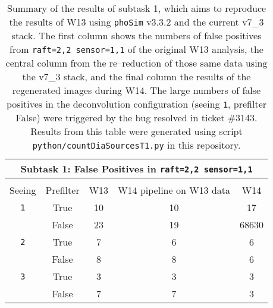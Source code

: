 \documentclass[prd, nofootinbib, floatfix, 11pt, tightenlines, times]{article}
\begin{document}

\begin{table}
\centering
\begin{tabular}{ccccc}
\hline
\multicolumn{5}{|c|}{Subtask 1: False Positives in {\tt raft=2,2 sensor=1,1}} \\ \hline \\
Seeing  & Prefilter    & W13  & W14 pipeline on W13 data   & W14   \\
\hline
{\tt 1} & True         & 10   & 10                         & 17    \\
        & False        & 23   & 19                         & 68630 \\
{\tt 2} & True         & 7    & 6                          & 6     \\
        & False        & 8    & 8                          & 6     \\
{\tt 3} & True         & 3    & 3                          & 3     \\
        & False        & 7    & 7                          & 3 
\end{tabular}
\caption[]{Summary of the results of subtask 1, which aims to
  reproduce the results of W13 using {\tt phoSim} v3.3.2 and the
  current v7\_3 stack.  The first column shows the numbers of false
  positives from {\tt raft=2,2 sensor=1,1} of the original W13
  analysis, the central column from the re--reduction of those same
  data using the v7\_3 stack, and the final column the results of the
  regenerated images during W14.  The large numbers of false positives
  in the deconvolution configuration (seeing {\tt 1}, prefilter False)
  were triggered by the bug resolved in ticket \#3143.  Results from
  this table were generated using script {\tt
    python/countDiaSourcesT1.py} in this repository.}
\label{tab:task1}
\end{table}
\end{document}
